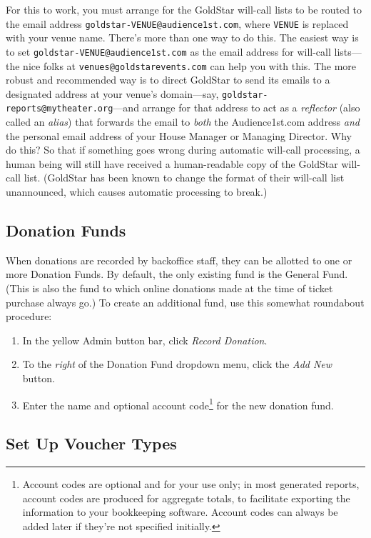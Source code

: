 For this to work, you must arrange for the GoldStar will-call lists to
be routed to the email address \verb+goldstar-VENUE@audience1st.com+,
where \verb+VENUE+ is replaced with your venue name.  There's more than
one way to do this.  The easiest way is to 
set \verb+goldstar-VENUE@audience1st.com+ as the email address  for
will-call lists---the nice folks at \verb+venues@goldstarevents.com+ can
help you with this.  The more robust and recommended way is to direct
GoldStar to send its emails to a designated address at your venue's
domain---say, \verb+goldstar-reports@mytheater.org+---and arrange for
that address to act as a \emph{reflector} (also called an \emph{alias})
that forwards the email to \emph{both} the Audience1st.com address
\emph{and} the personal email address of your House Manager or Managing
Director.  Why do this?  So that if something goes wrong during
automatic will-call processing, a human being
will still have received a human-readable copy of the GoldStar will-call
list.  (GoldStar has been known to change the format of their will-call
list unannounced, which causes automatic processing to break.)

\subsection{Donation Funds}

When donations are recorded by backoffice staff, they can be allotted to
one or more Donation Funds.  By default, the only existing fund is the
General Fund.  (This is also the fund to which online donations made at
the time of ticket purchase always go.)  To create an additional fund,
use this somewhat roundabout procedure:

\begin{enumerate}
\item In the yellow Admin button bar, click \emph{Record Donation}.
\item To the \emph{right} of the Donation Fund dropdown menu, click the
  \emph{Add New} button.
\item Enter the name and optional account code\footnote{Account codes
    are optional and for your use only; in most generated reports,
    account codes are produced for aggregate totals, to facilitate
    exporting the information to your bookkeeping software. Account
    codes can always be added later if they're not specified initially.} 
  for  the new donation fund.
\end{enumerate}

\subsection{Set Up Voucher Types}
\label{sec:setup-vouchertypes}

